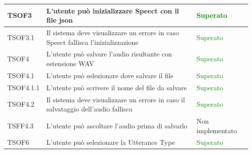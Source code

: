 \documentclass[openany,12pt,a4paper]{report}
\begin{document}
\begin{longtable}[c]{| p{2cm} |p{8cm} | p{2.5cm} |}
	\newline TSOF3&		
	\newline L'utente può inizializzare Speect con il file json&
	\newline \textcolor{green}{Superato}
	\\[1em]	
	\hline	
	
	\newline TSOF3.1&
	\newline Il sistema deve visualizzare un errore in caso Speect fallisca l'inizializzazione&
	\newline \textcolor{green}{Superato}
	\\[1em]		
	\hline
	
	\newline TSOF4&
	\newline L'utente può salvare l'audio risultante con estensione WAV&
	\newline \textcolor{green}{Superato}
	\\[1em]
	\hline
	
	\newline TSOF4.1&
	\newline L'utente può selezionare dove salvare il file&
	\newline \textcolor{green}{Superato}
	\\[1em]
	
	\hline	
	\newline TSOF4.1.1&
	\newline L'utente può scrivere il nome del file da salvare&
	\newline \textcolor{green}{Superato}
	\\[1em]
	
	\hline
	\newline TSOF4.2&
	\newline Il sistema deve visualizzare un errore in caso il salvataggio dell'audio fallisca&
	\newline \textcolor{green}{Superato}
	\\[1em]
	\hline
	
	\newline TSFF4.3&
	\newline L'utente può ascoltare l'audio prima di salvarlo&
	\newline Non implementato
	\\[1em]
	\hline
	\newline TSOF6&
	\newline L'utente può selezionare la Utterance Type&
	\newline \textcolor{green}{Superato}
	\\[1em]
	\hline
	

\end{longtable}
\end{document}
